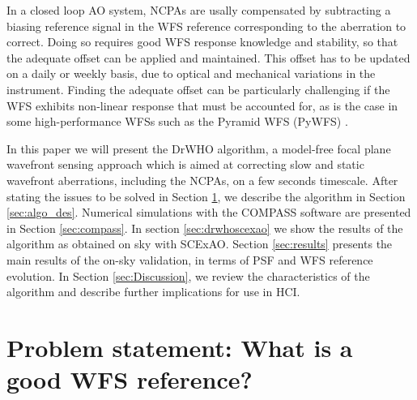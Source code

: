 \documentclass[twocolumn]{aa}
\newcommand{\anthony}[1]{\textcolor{magenta}{#1}}
\begin{document}
In a closed loop AO system, NCPAs are usally compensated by subtracting a biasing reference signal
in the WFS reference corresponding to the aberration to correct. Doing so requires good WFS response knowledge and stability, so that the adequate offset can be applied and maintained. This offset has to be updated on a daily or weekly basis, due to optical and mechanical variations in the instrument. Finding the adequate offset can be particularly challenging if the WFS exhibits non-linear response that must be accounted for, as is the case in some high-performance WFSs such as the Pyramid WFS (PyWFS) \citep{Esposito2020,Deo2019gain,Chambouleyron2020, Chambouleyron2021}.  



In this paper we will present the DrWHO algorithm, a model-free focal plane wavefront sensing approach which is aimed at correcting slow and static wavefront aberrations, including the NCPAs, on a few seconds timescale. After stating the issues to be solved in Section \ref{sec:problem_statement}, we describe the algorithm in Section \ref{sec:algo_des}. Numerical simulations with the COMPASS software \citep{Compass} are presented in Section \ref{sec:compass}. 
In section \ref{sec:drwhoscexao} we show the results of the algorithm as obtained on sky with SCExAO.
Section \ref{sec:results} presents the main results of the on-sky validation, in terms of PSF and WFS reference evolution. In Section \ref{sec:Discussion}, we review the characteristics of the algorithm and describe further implications for use in HCI. 






\section{Problem statement: What is a good WFS reference?}\label{sec:problem_statement}
\end{document}
